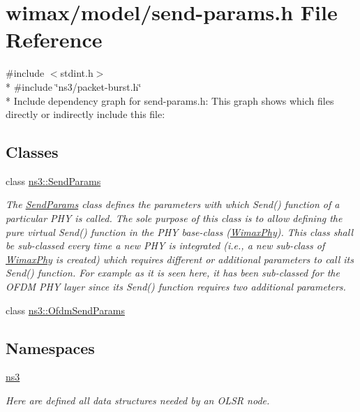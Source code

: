 \hypertarget{send-params_8h}{}\section{wimax/model/send-\/params.h File Reference}
\label{send-params_8h}
{\ttfamily \#include $<$stdint.\+h$>$}\\*
{\ttfamily \#include \char`\"{}ns3/packet-\/burst.\+h\char`\"{}}\\*
Include dependency graph for send-\/params.h\+:
This graph shows which files directly or indirectly include this file\+:
\subsection*{Classes}
\begin{DoxyCompactItemize}
\item 
class \hyperlink{classns3_1_1SendParams}{ns3\+::\+Send\+Params}
\begin{DoxyCompactList}\small\item\em The \hyperlink{classns3_1_1SendParams}{Send\+Params} class defines the parameters with which Send() function of a particular P\+HY is called. The sole purpose of this class is to allow defining the pure virtual Send() function in the P\+HY base-\/class (\hyperlink{classns3_1_1WimaxPhy}{Wimax\+Phy}). This class shall be sub-\/classed every time a new P\+HY is integrated (i.\+e., a new sub-\/class of \hyperlink{classns3_1_1WimaxPhy}{Wimax\+Phy} is created) which requires different or additional parameters to call its Send() function. For example as it is seen here, it has been sub-\/classed for the O\+F\+DM P\+HY layer since its Send() function requires two additional parameters. \end{DoxyCompactList}\item 
class \hyperlink{classns3_1_1OfdmSendParams}{ns3\+::\+Ofdm\+Send\+Params}
\end{DoxyCompactItemize}
\subsection*{Namespaces}
\begin{DoxyCompactItemize}
\item 
 \hyperlink{namespacens3}{ns3}
\begin{DoxyCompactList}\small\item\em Here are defined all data structures needed by an O\+L\+SR node. \end{DoxyCompactList}\end{DoxyCompactItemize}
